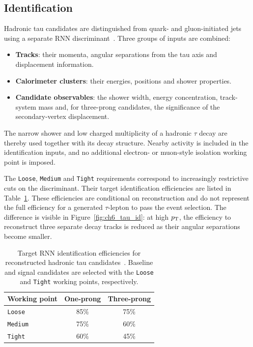 \subsection{Identification}

Hadronic tau candidates are distinguished from quark- and gluon-initiated jets using a separate RNN discriminant~\cite{ATLAS2019TauRNN,ATLAS2022TauR22}.
Three groups of inputs are combined:
\begin{itemize}
    \item \textbf{Tracks}: their momenta, angular separations from the tau axis and displacement information.
    \item \textbf{Calorimeter clusters}: their energies, positions and shower properties.
    \item \textbf{Candidate observables}: the shower width, energy concentration, track-system mass and, for three-prong candidates, the significance of the secondary-vertex displacement.
\end{itemize}
The narrow shower and low charged multiplicity of a hadronic $\tau$ decay are thereby used together with its decay structure.
Nearby activity is included in the identification inputs, and no additional electron- or muon-style isolation working point is imposed.

The \texttt{Loose}, \texttt{Medium} and \texttt{Tight} requirements correspond to increasingly restrictive cuts on the discriminant.
Their target identification efficiencies are listed in Table~\ref{tab:ch6_tau_id}.
These efficiencies are conditional on reconstruction and do not represent the full efficiency for a generated $\tau$-lepton to pass the event selection.
The difference is visible in Figure~\ref{fig:ch6_tau_id}: at high $p_{\mathrm{T}}$, the efficiency to reconstruct three separate decay tracks is reduced as their angular separations become smaller.

\begin{table}[htbp]
    \centering
    \caption{Target RNN identification efficiencies for reconstructed hadronic tau candidates~\cite{ATLAS2022TauR22}. Baseline and signal candidates are selected with the \texttt{Loose} and \texttt{Tight} working points, respectively.}
    \label{tab:ch6_tau_id}
    \begin{tabular}{lcc}
        \toprule
        Working point & One-prong & Three-prong \\
        \midrule
        \texttt{Loose} & 85\% & 75\% \\
        \texttt{Medium} & 75\% & 60\% \\
        \texttt{Tight} & 60\% & 45\% \\
        \bottomrule
    \end{tabular}
\end{table}


